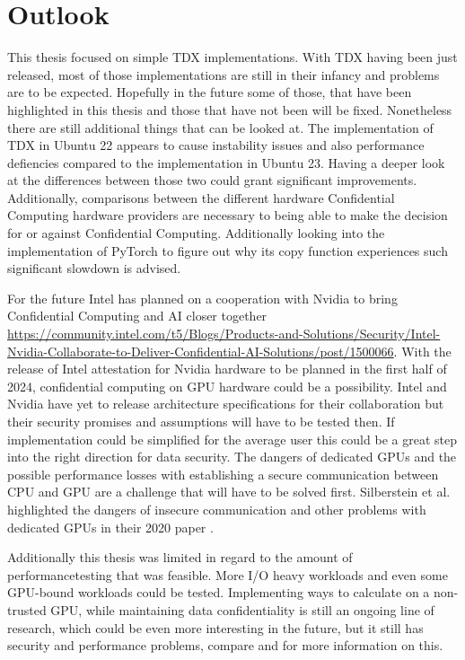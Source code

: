 \section{Outlook}

This thesis focused on simple TDX implementations. With TDX having been just released, most of those implementations are still in their infancy and problems are to be expected. Hopefully in the future some of those, that have been highlighted in this thesis and those that have not been will be fixed. Nonetheless there are still additional things that can be looked at. The implementation of TDX in Ubuntu 22 appears to cause instability issues and also performance defiencies compared to the implementation in Ubuntu 23. Having a deeper look at the differences between those two could grant significant improvements. Additionally, comparisons between the different hardware Confidential Computing hardware providers are necessary to being able to make the decision for or against Confidential Computing. Additionally looking into the implementation of PyTorch to figure out why its copy function experiences such significant slowdown is advised. 

For the future Intel has planned on a cooperation with Nvidia to bring Confidential Computing and AI closer together \url{https://community.intel.com/t5/Blogs/Products-and-Solutions/Security/Intel-Nvidia-Collaborate-to-Deliver-Confidential-AI-Solutions/post/1500066}. With the release of Intel attestation for Nvidia hardware to be planned in the first half of 2024, confidential computing on GPU hardware could be a possibility. Intel and Nvidia have yet to release architecture specifications for their collaboration but their security promises and assumptions will have to be tested then. If implementation could be simplified for the average user this could be a great step into the right direction for data security. The dangers of dedicated GPUs and the possible performance losses with establishing a secure communication between CPU and GPU are a challenge that will have to be solved first. Silberstein et al. highlighted the dangers of insecure communication and other problems with dedicated GPUs in their 2020 paper \cite{zhu_enabling_2020}.

Additionally this thesis was limited in regard to the amount of performancetesting that was feasible. More I/O heavy workloads and even some GPU-bound workloads could be tested. Implementing ways to calculate on a non-trusted GPU, while maintaining data confidentiality is still an ongoing line of research, which could be even more interesting in the future, but it still has security and performance problems, compare \cite{ogburn_homomorphic_2013} and \cite{li_security_2020} for more information on this.

